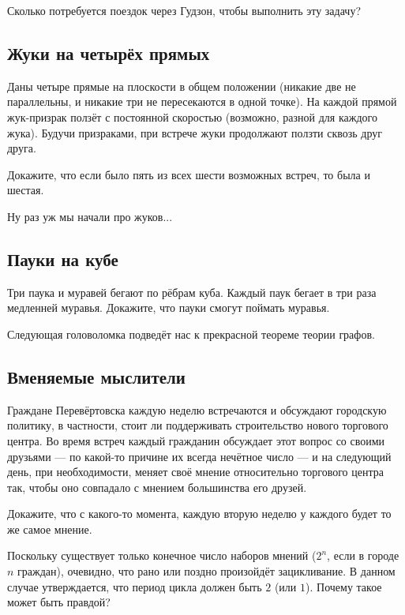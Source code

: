 Сколько потребуется поездок через Гудзон, чтобы выполнить эту задачу?

\subsection*{Жуки на четырёх прямых}

Даны четыре прямые на плоскости в общем положении (никакие две не параллельны, и никакие три не пересекаются в одной точке).
На каждой прямой жук-призрак ползёт с постоянной скоростью (возможно, разной для каждого жука).
Будучи призраками, при встрече жуки продолжают ползти сквозь друг друга.

Докажите, что если было пять из всех шести возможных встреч,
то была и шестая.

\medskip

Ну раз уж мы начали про жуков...

\subsection*{Пауки на кубе}

Три паука и муравей бегают по рёбрам куба.
Каждый паук бегает в три раза медленней муравья.
Докажите, что пауки смогут поймать муравья.

\medskip

Следующая головоломка подведёт нас к прекрасной теореме теории графов.

\subsection*{Вменяемые мыслители}

Граждане Перевёртовска каждую неделю встречаются и обсуждают городскую политику, в частности, стоит ли поддерживать строительство нового торгового центра.
Во время встреч каждый гражданин обсуждает этот вопрос со своими друзьями --- по какой-то причине их всегда нечётное число --- и на следующий день, при необходимости, меняет своё мнение относительно торгового центра так, чтобы оно совпадало с мнением большинства его друзей.

Докажите, что с какого-то момента, каждую вторую неделю у каждого будет то же самое мнение.

Поскольку существует только конечное число наборов мнений ($2^n$, если в городе $n$ граждан), очевидно, что рано или поздно произойдёт зацикливание.
В данном случае утверждается, что период цикла должен быть $2$ (или $1$).
Почему такое может быть правдой?


